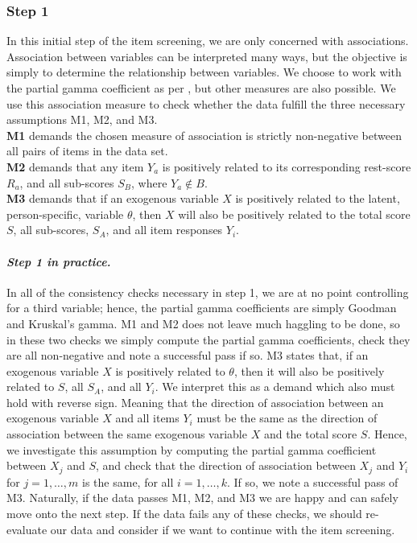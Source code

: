 \documentclass[a4project,12pt]{article}
\theoremstyle{examplestyle}
\theoremstyle{defstyle}
\theoremstyle{thmstyle}
\begin{document}
\subsubsection{Step 1} In this initial step of the item screening, we are only concerned with associations. Association between variables can be interpreted many ways, but the objective is simply to determine the relationship between variables. We choose to work with the partial gamma coefficient as per \citet{kreiner-christensen-2011}, but other measures are also possible. We use this association measure to check whether the data fulfill the three necessary assumptions M1, M2, and M3. \\
\textbf{M1} demands the chosen measure of association is strictly non-negative between all pairs of items in the data set. \\
\textbf{M2} demands that any item $Y_a$ is positively related to its corresponding rest-score $R_a$, and all sub-scores $S_B$, where $Y_a\not\in B$. \\
\textbf{M3} demands that if an exogenous variable $X$ is positively related to the latent, person-specific, variable $\theta$, then $X$ will also be positively related to the total score $S$, all sub-scores, $S_A$, and all item responses $Y_i$. 

\paragraph{\textit{Step 1 in practice.}} In all of the consistency checks necessary in step 1, we are at no point controlling for a third variable; hence, the partial gamma coefficients are simply Goodman and Kruskal's gamma. M1 and M2 does not leave much haggling to be done, so in these two checks we simply compute the partial gamma coefficients, check they are all non-negative and note a successful pass if so. M3 states that, if an exogenous variable $X$ is positively related to $\theta$, then it will also be positively related to $S$, all $S_A$, and all $Y_i$. We interpret this as a demand which also must hold with reverse sign. Meaning that the direction of association between an exogenous variable $X$ and all items $Y_i$ must be the same as the direction of association between the same exogenous variable $X$ and the total score $S$. Hence, we investigate this assumption by computing the partial gamma coefficient between $X_j$ and $S$, and check that the direction of association between $X_j$ and $Y_i$ for $j=1,\dots,m$ is the same, for all $i=1,\dots, k$. If so, we note a successful pass of M3. Naturally, if the data passes M1, M2, and M3 we are happy and can safely move onto the next step. If the data fails any of these checks, we should re-evaluate our data and consider if we want to continue with the item screening. 
\end{document}
